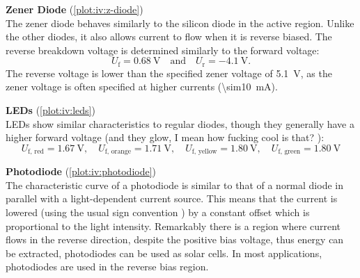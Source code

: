 \textbf{Zener Diode} (\autoref{plot:iv:z-diode})\\
The zener diode behaves similarly to the silicon diode in the active region.
Unlike the other diodes, it also allows current to flow when it is reverse biased.
The reverse breakdown voltage is determined similarly to the forward voltage:
\begin{equation*}
	U_\text{f} = \SI{0.68}{\volt} \quad \text{and} \quad U_\text{r} = \SI{-4.1}{\volt}.
\end{equation*}
The reverse voltage is lower than the specified zener voltage of \SI{5.1}{\volt}, as the zener voltage is often specified at higher currents (\SI{\sim10}{\mA}).

\textbf{LEDs} (\autoref{plot:iv:leds})\\
LEDs show similar characteristics to regular diodes, though they generally have a higher forward voltage (and they glow, I mean how fucking cool is that? ):
\begin{equation*}
	U_\text{f, red} = \SI{1.67}{\volt}, \quad U_\text{f, orange} = \SI{1.71}{\volt}, \quad U_\text{f, yellow} = \SI{1.80}{\volt}, \quad U_\text{f, green} = \SI{1.80}{\volt}
\end{equation*}

\textbf{Photodiode} (\autoref{plot:iv:photodiode})\\
The characteristic curve of a photodiode is similar to that of a normal diode in parallel with a light-dependent current source.
This means that the current is lowered (using the usual sign convention ) by a constant offset which is proportional to the light intensity.
Remarkably there is a region where current flows in the reverse direction, despite the positive bias voltage, thus energy can be extracted, photodiodes can be used as solar cells.
In most applications, photodiodes are used in the reverse bias region.

\def\ivsubfigwidth{0.45\textwidth}
\def\ivgraphicswidth{1.1\textwidth}

